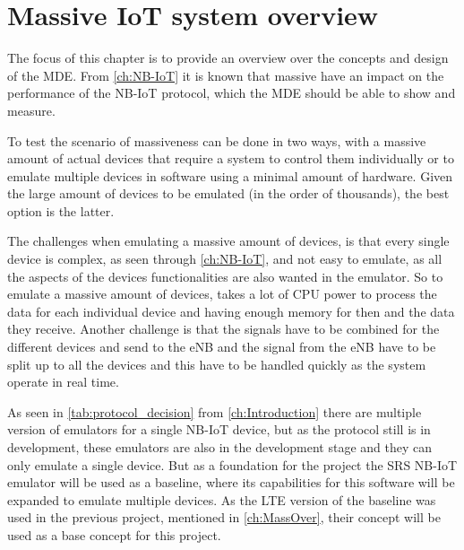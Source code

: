 \chapter{Massive IoT system overview}
\label{ch:MassOver}
The focus of this chapter is to provide an overview over the concepts and design of the \gls{MDE}. From \autoref{ch:NB-IoT} it is known that massive have an impact on the performance of the NB-IoT protocol, which the MDE should be able to show and measure.



To test the scenario of massiveness can be done in two ways, with a massive amount of actual devices that require a system to control them individually or to emulate multiple devices in software using a minimal amount of hardware. Given the large amount of devices to be emulated (in the order of thousands), the best option is the latter.

The challenges when emulating a massive amount of devices, is that every single device is complex, as seen through \autoref{ch:NB-IoT}, and not easy to emulate, as all the aspects of the devices functionalities are also wanted in the emulator. So to emulate a massive amount of devices, takes a lot of CPU power to process the data for each individual device and having enough memory for then and the data they receive. Another challenge is that the signals have to be combined for the different devices and send to the eNB and the signal from the eNB have to be split up to all the devices and this have to be handled quickly as the system operate in real time.

As seen in \autoref{tab:protocol_decision} from \autoref{ch:Introduction} there are multiple version of emulators for a single NB-IoT device, but as the protocol still is in development, these emulators are also in the development stage and they can only emulate a single device. But as a foundation for the project the SRS NB-IoT emulator will be used as a baseline, where its capabilities for this software will be expanded to emulate multiple devices. As the LTE version of the baseline was used in the previous project, mentioned in \autoref{ch:MassOver}, their concept will be used as a base concept for this project.


